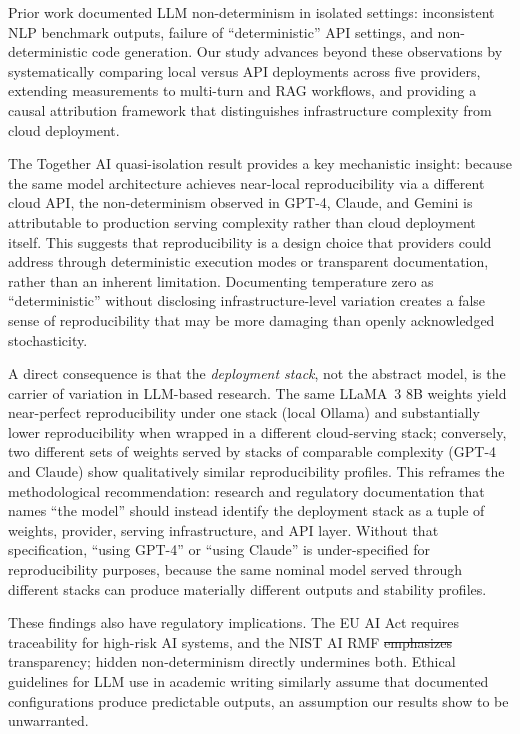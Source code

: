\documentclass[sn-nature]{sn-jnl}
\makeatletter
\providecommand{\DIFadd}[1]{{\protect\color{blue}\uwave{#1}}} %
\providecommand{\DIFdel}[1]{{\protect\color{red}\sout{#1}}} %
\providecommand{\DIFaddbegin}{} %
\providecommand{\DIFaddend}{} %
\providecommand{\DIFdelbegin}{} %
\providecommand{\DIFdelend}{} %
\providecommand{\DIFscaledelfig}{0.5}
\newlength{\DIFdelgraphicswidth} %
\newlength{\DIFdelgraphicsheight} %
\providecommand{\DIFaddincludegraphics}[2][]{{\color{blue}\fbox{\DIFOincludegraphics[#1]{#2}}}} %
\providecommand{\DIFdelincludegraphics}[2][]{%
\sbox{\DIFdelgraphicsbox}{\DIFOincludegraphics[#1]{#2}}%
\settoboxwidth{\DIFdelgraphicswidth}{\DIFdelgraphicsbox} %
\settoboxtotalheight{\DIFdelgraphicsheight}{\DIFdelgraphicsbox} %
\scalebox{\DIFscaledelfig}{%
\parbox[b]{\DIFdelgraphicswidth}{\usebox{\DIFdelgraphicsbox}\\[-\baselineskip] \rule{\DIFdelgraphicswidth}{0em}}\llap{\resizebox{\DIFdelgraphicswidth}{\DIFdelgraphicsheight}{%
\setlength{\unitlength}{\DIFdelgraphicswidth}%
\begin{picture}(1,1)%
\thicklines\linethickness{2pt} %
{\color[rgb]{1,0,0}\put(0,0){\framebox(1,1){}}}%
{\color[rgb]{1,0,0}\put(0,0){\line( 1,1){1}}}%
{\color[rgb]{1,0,0}\put(0,1){\line(1,-1){1}}}%
\end{picture}%
}\hspace*{3pt}}} %
} %
\DeclareRobustCommand{\DIFaddbegin}{\DIFOaddbegin \let\includegraphics\DIFaddincludegraphics} %
\DeclareRobustCommand{\DIFaddend}{\DIFOaddend \let\includegraphics\DIFOincludegraphics} %
\DeclareRobustCommand{\DIFdelbegin}{\DIFOdelbegin \let\includegraphics\DIFdelincludegraphics} %
\DeclareRobustCommand{\DIFdelend}{\DIFOaddend \let\includegraphics\DIFOincludegraphics} %
\let\sout@orig\sout %
\renewcommand{\sout}[1]{\ifmmode\text{\sout@orig{\ensuremath{#1}}}\else\sout@orig{#1}\fi} %
\makeatother
\begin{document}
Prior work documented LLM non-determinism in isolated settings: inconsistent NLP benchmark outputs\cite{chen2023chatgpt}, failure of ``deterministic'' API settings\cite{atil2024nondeterminism}, and non-deterministic code generation\cite{ouyang2024nondeterminism}.
Our study advances beyond these observations by systematically comparing local versus API deployments across five providers, extending measurements to multi-turn and RAG workflows, and providing a causal attribution framework that distinguishes infrastructure complexity from cloud deployment.

The Together AI quasi-isolation result provides a key mechanistic insight: because the same model architecture achieves near-local reproducibility via a different cloud API, the non-determinism observed in GPT-4, Claude, and Gemini is attributable to production serving complexity rather than cloud deployment itself.
This suggests that reproducibility is a design choice that providers could address through deterministic execution modes or transparent documentation, rather than an inherent limitation.
Documenting temperature zero as ``deterministic'' without disclosing infrastructure-level variation creates a false sense of reproducibility that may be more damaging than openly acknowledged stochasticity.

A direct consequence is that the \emph{deployment stack}, not the abstract model, is the carrier of variation in LLM-based research.
The same LLaMA~3 8B weights yield near-perfect reproducibility under one stack (local Ollama) and substantially lower reproducibility when wrapped in a different cloud-serving stack; conversely, two different sets of weights served by stacks of comparable complexity (GPT-4 and Claude) show qualitatively similar reproducibility profiles.
This reframes the methodological recommendation: research and regulatory documentation that names ``the model'' should instead identify the deployment stack as a tuple of weights, provider, serving infrastructure, and API layer.
Without that specification, ``using GPT-4'' or ``using Claude'' is under-specified for reproducibility purposes, because the same nominal model served through different stacks can produce materially different outputs and stability profiles.

These findings also have regulatory implications.
The EU AI Act\cite{euaiact2024} requires traceability for high-risk AI systems, and the NIST AI RMF\cite{nist2023ai} \DIFdelbegin \DIFdel{emphasizes }\DIFdelend \DIFaddbegin \DIFadd{emphasises }\DIFaddend transparency; hidden non-determinism directly undermines both.
Ethical guidelines for LLM use in academic writing\cite{porsdam2024ethics} similarly assume that documented configurations produce predictable outputs, an assumption our results show to be unwarranted.
\end{document}

